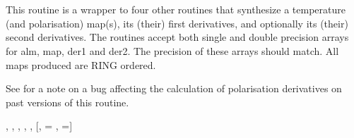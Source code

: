 \sloppy
{}\section[alm2map\_der*]{ }
\label{sub:alm2map_der}
\author{Eric Hivon}

\begin{facility}
{This routine is a wrapper to four other routines that synthesize a \healpix
  temperature (and polarisation) map(s), its (their) first derivatives, and optionally
  its (their) second derivatives.
The routines accept both single and double precision arrays for alm, map, der1 and
der2. The precision of these arrays should match. All maps produced are RING
ordered.

See   for a note on a bug
affecting the calculation of polarisation derivatives on past versions of this routine.
}
{\modAlmTools}
\end{facility}

\begin{f90format}
{%
, %
, %
, %
, %
, %
 [, =%
, =]}
\end{f90format}

